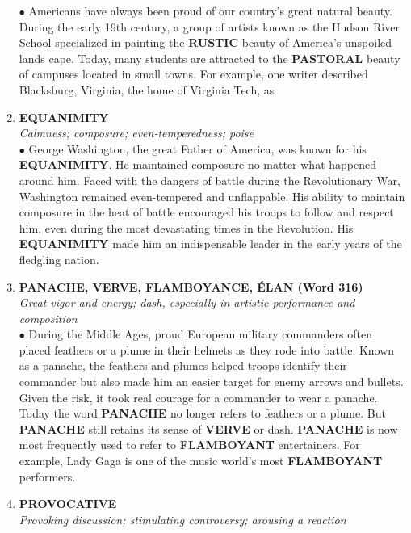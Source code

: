 \documentclass{book}
\begin{document}
\begin{enumerate}
$\bullet$  Americans have always been proud of our country's great natural beauty. During the early 19th century, a group of artists known as the Hudson River School specialized in painting the \textbf{RUSTIC} beauty of America's unspoiled lands cape. Today, many students are attracted to the \textbf{PASTORAL} beauty of campuses located in small towns. For example, one writer described Blacksburg, Virginia, the home of Virginia Tech, as 
 
 \item \textbf{EQUANIMITY}\\
 \textit{ Calmness; composure; even-temperedness; poise}\\
 
 $\bullet$ George Washington, the great Father of America, was known for his \textbf{EQUANIMITY}. He maintained composure no matter what happened around him. Faced with the dangers of battle during the Revolutionary War, Washington remained even-tempered and unflappable. His ability to maintain composure in the heat of battle encouraged his troops to follow and respect him, even during the most devastating times in the Revolution. His \textbf{EQUANIMITY} made him an indispensable leader in the early years of the fledgling nation.
 
\item \textbf{PANACHE, VERVE, FLAMBOYANCE, ÉLAN (Word 316)}\\ \textit{Great vigor and energy; dash, especially in artistic performance and composition }\\

$\bullet$ During the Middle Ages, proud European military commanders often placed feathers or a plume in their helmets as they rode into battle. Known as a panache, the feathers and plumes helped troops identify their commander but also made him an easier target for enemy arrows and bullets. Given the risk, it took real courage for a commander to wear a panache. Today the word \textbf{PANACHE} no longer refers to feathers or a plume. But \textbf{PANACHE} still retains its sense of \textbf{VERVE} or dash. \textbf{PANACHE} is now most frequently used to refer to \textbf{FLAMBOYANT} entertainers. For example, Lady Gaga is one of the music world's most \textbf{FLAMBOYANT} performers. 

\item \textbf{PROVOCATIVE}\\
\textit{ Provoking discussion; stimulating controversy; arousing a reaction}\\


\end{enumerate}
\end{document}
